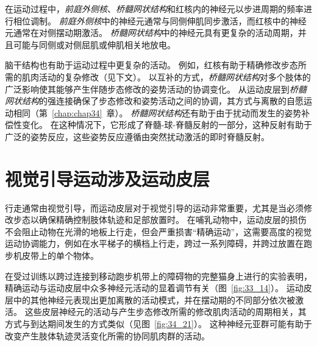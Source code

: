 在运动过程中，\textit{前庭外侧核}、\textit{桥髓网状结构}和红核内的神经元以步进周期的频率进行相位调制。
\textit{前庭外侧核}中的神经元通常与同侧伸肌同步激活，而红核中的神经元通常在对侧摆动期激活。
\textit{桥髓网状结构}中的神经元具有更复杂的活动周期，并且可能与同侧或对侧屈肌或伸肌相关地放电。


脑干结构也有助于运动过程中更复杂的活动。
例如，红核有助于精确修改步态所需的肌肉活动的复杂修改（见下文）。
以互补的方式，\textit{桥髓网状结构}对多个肢体的广泛影响使其能够产生伴随步态修改的姿势活动的协调变化。
从运动皮层到\textit{桥髓网状结构}的强连接确保了步态修改和姿势活动之间的协调，其方式与离散的自愿运动相同（第~\ref{chap:chap34}~章）。
\textit{桥髓网状结构}还有助于由于扰动而发生的姿势补偿性变化。
在这种情况下，它形成了脊髓-球-脊髓反射的一部分，这种反射有助于广泛的姿势反应，这些姿势反应遵循由突然扰动激活的即时脊髓反射。



\section{视觉引导运动涉及运动皮层}

行走通常由视觉引导，而运动皮层对于视觉引导的运动非常重要，尤其是当必须修改步态以确保精确控制肢体轨迹和足部放置时。
在哺乳动物中，运动皮层的损伤不会阻止动物在光滑的地板上行走，但会严重损害“精确运动”，这需要高度的视觉运动协调能力，例如在水平梯子的横档上行走，跨过一系列障碍，并跨过放置在跑步机皮带上的单个物体。


在受过训练以跨过连接到移动跑步机带上的障碍物的完整猫身上进行的实验表明，精确运动与运动皮层中众多神经元活动的显着调节有关（图~\ref{fig:33_14}）。
运动皮层中的其他神经元表现出更加离散的活动模式，并在摆动期的不同部分依次被激活。
这些皮层神经元的活动与产生步态修改所需的修改肌肉活动的周期相关，其方式与到达期间发生的方式类似（见图~\ref{fig:34_21}）。
这种神经元亚群可能有助于改变产生肢体轨迹灵活变化所需的协同肌肉群的活动。


